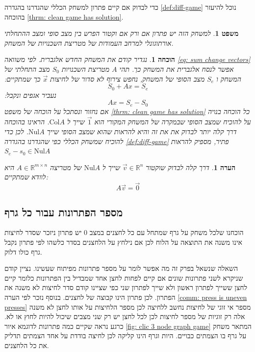 \documentclass[12pt,leqno]{article}
\theoremstyle{theoremdd}
\newtheorem{theorem}{משפט}[section]
\newtheorem{comm}{הערה}[section]
\newtheorem*{prove}{הוכחה}
\newcommand{\Col}{\mathrm{Col}}
\newcommand{\Nul}{\mathrm{Nul}}
\begin{document}
כדי לבדוק אם קיים פתרון למשחק הכללי שהגדרנו 
בהגדרה 
\ref{def:diff-game}
נוכל להיעזר בהוכחה
\ref{thrm: clean game has solution}.
\begin{theorem}
    למשחק הזה יש פתרון אם ורק אם וקטור הפרש בין מצב סופי ומצב ההתחלתי אורתוגונלי למרחב 
    העמודות של מטריצת השכנויות של המשחק.
\end{theorem}
\begin{prove}
    נגדיר קודם את המשחק החדש אלגברית.
    לפי משוואה 
    \ref{eq: sum change vectors}
    אפשר לנסח אלגברית את המשחק כך.
    תהי 
    $A$
    מטריצת השכנויות 
    $S_0$
    מצב התחלתי של המשחק 
    ו
    $S_e$
    מצב הסופי של המשחק,
    נחפש צירוף 
    לא סדור של לחיצות 
    $\vec x$
    כך שמתקיים:
    \[
        S_0 + Ax = S_e
    \]
    נעביר אגפים ונקבל:
    \[
         Ax = S_e - S_0
    \]
    אם נחזור ונסתכל על הוכחה
    של משפט 
    \ref{thrm: clean game has solution}
    כל הוכחה בנויה על להוכיח שמצב הסופי 
    שבמקרה של המשחק המקורי הוא 
    $\vec 1$
    שייך ל
    $\Col A$.
    הראינו בהוכחה דרך 
    קלה יותר לבדוק את את זה והיא
    להראות שהוא שמצב
    הסופי 
    שייך 
    $\Nul A$.
    לכן כדי להוכיח שמשחק הכללי כפי שהגדרנו 
    בהגדרה 
    \ref{def:diff-game}
    פתיר, 
    מספיק להראות 
    $S_e - s_0 \in \Nul A$
\end{prove}
\begin{comm}
    דרך קלה לבדוק שוקטור 
    $\vec v \in \mathbb{R}^{n}$
    שייך 
    ל
    $\Nul A$
    של מטריצה 
    $A \in \mathbb{R}^{m \times n}$
    היא לוודא שמתקיים:
    \[ A \vec v = \vec 0\]
\end{comm}
\subsection{מספר הפתרונות עבור כל גרף}
הוכחנו שלכל משחק על גרף שמתחל עם כל לחצנים במצב 
$0$
יש פתרון ניזכר שסדר לחיצות
אינו משנה את התוצאה על הלוח לכן אם נילחץ על הלחצנים בסדר כלשהו 
לפי פתרון נקבל גרף כולו דלוק.

השאלה  שנשאל בפרק זה מה אפשר לומר על מספר פתרונות מפיתוח שעשינו.
נציין קודם שניקרא לשני פתרונות שונים אם קיים לפחות לחצן אחד שמבדיל בין הפתרונות 
כלומר קיים לחצן ששייך לפתרון ראשון ולא שייך לפתרון שני כפי שציינו קודם סדר
לחיצות לא משנה את הפתרון.
לכן פתרון הינו קבוצה של לחצנים.
בנוסף נזכר לפי הערה
\ref{comm: press is uneven presses}
מספר אי זוגי של לחיצות נחשב ללחיצה לכן מספר הלחיצות על אותו לחצן לא משנה 
אלה רק זוגיות של מספר לחיצות 
לכן לכל לחצן יש רק שני מצבים שיכול להיות 
לחוץ 
או לא.
כרגע נראה שקיים כמה פתרונות לדוגמא 
איור
\ref{fig: clic 3 node graph game}
המתאר משחק על גרף בו הצמתים כבויים.
היות וגרף הינו קליקה לכן לחיצה בודדת על אחד הצמתים תדליק את כל הלחצנים.
\end{document}
